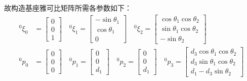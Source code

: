 \documentclass[UTF8, 13pt]{ctexart}
\begin{document}
故构造基座雅可比矩阵所需各参数如下：
\[
\begin{aligned}
    {}^0 \xi_0 &= \begin{bmatrix}
                    0 \\ 0 \\ 1
                \end{bmatrix} \quad
    {}^0 \xi_1 = \begin{bmatrix}
                    -\sin\theta_1 \\ \cos\theta_1 \\ 0
                \end{bmatrix} \quad
    {}^0 \xi_2 = \begin{bmatrix}
                    \cos\theta_1 \cos\theta_2 \\ \sin\theta_1 \cos\theta_2 \\ -\sin\theta_2
                \end{bmatrix} \\
    {}^0 p_0 &= \begin{bmatrix}
                    0 \\ 0 \\ 0
                \end{bmatrix} \quad
    {}^0 p_1 = \begin{bmatrix}
                    0 \\ 0 \\ d_1
                \end{bmatrix} \quad
    {}^0 p_2 = \begin{bmatrix}
                    0 \\ 0 \\ d_1
                \end{bmatrix} \quad
    {}^0 p_3 = \begin{bmatrix}
                    d_3 \cos\theta_1 \cos\theta_2 \\
                    d_3 \sin\theta_1 \cos\theta_2 \\
                    d_1 - d_3 \sin\theta_2
                \end{bmatrix} \\
\end{aligned}
\]
\end{document}
